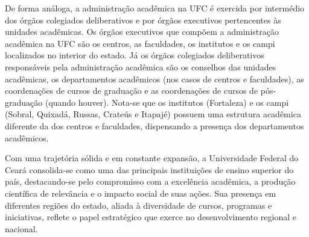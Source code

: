 De forma análoga, a administração acadêmica na UFC é exercida por intermédio dos órgãos colegiados deliberativos e por órgãos executivos pertencentes às unidades acadêmicas. Os órgãos executivos que compõem a administração acadêmica na UFC são os centros, as faculdades, os institutos e os campi localizados no interior do estado. Já os órgãos colegiados deliberativos responsáveis pela administração acadêmica são os conselhos das unidades acadêmicas, os departamentos acadêmicos (nos casos de centros e faculdades), as coordenações de cursos de graduação e as coordenações de cursos de pós-graduação (quando houver). Nota-se que os institutos (Fortaleza) e os campi  (Sobral, Quixadá, Russas, Crateús e Itapajé) possuem uma estrutura acadêmica diferente da dos centros e faculdades, dispensando a presença dos departamentos acadêmicos.

Com uma trajetória sólida e em constante expansão, a Universidade Federal do Ceará consolida-se como uma das principais instituições de ensino superior do país, destacando-se pelo compromisso com a excelência acadêmica, a produção científica de relevância e o impacto social de suas ações. Sua presença em diferentes regiões do estado, aliada à diversidade de cursos, programas e iniciativas, reflete o papel estratégico que exerce no desenvolvimento regional e nacional.